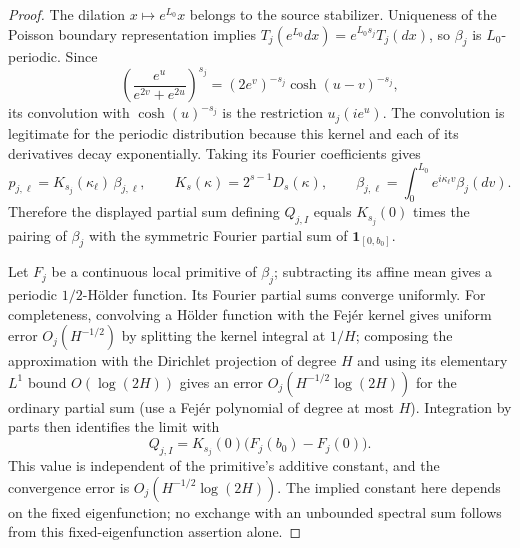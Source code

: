 \begin{proof}
The dilation $x\mapsto e^{L_0}x$ belongs to the source
stabilizer. Uniqueness of the Poisson boundary representation
implies $T_j(e^{L_0}dx)=e^{L_0s_j}T_j(dx)$, so $\beta_j$ is
$L_0$-periodic. Since
\[
 \left(\frac{e^u}{e^{2v}+e^{2u}}\right)^{s_j}
     =(2e^v)^{-s_j}\cosh(u-v)^{-s_j},
\]
its convolution with $\cosh(u)^{-s_j}$ is the restriction
$u_j(ie^u)$. The convolution is legitimate for the periodic
distribution because this kernel and each of its derivatives
decay exponentially. Taking its Fourier coefficients gives
\[
 p_{j,\ell}=K_{s_j}(\kappa_\ell)\,\beta_{j,\ell},
 \qquad K_s(\kappa)=2^{s-1}D_s(\kappa),\qquad
 \beta_{j,\ell}=\int_0^{L_0}e^{i\kappa_\ell v}\beta_j(dv).
\]
Therefore the displayed partial sum defining $Q_{j,I}$ equals
$K_{s_j}(0)$ times the pairing of $\beta_j$ with the symmetric
Fourier partial sum of $\mathbf1_{[0,b_0]}$.

Let $F_j$ be a continuous local primitive of $\beta_j$;
subtracting its affine mean gives a periodic $1/2$-H\"older
function. Its Fourier partial sums converge uniformly. For
completeness, convolving a H\"older function with the Fej\'er
kernel gives uniform error $O_j(H^{-1/2})$ by splitting the
kernel integral at $1/H$; composing the approximation with the
Dirichlet projection of degree $H$ and using its elementary
$L^1$ bound $O(\log(2H))$ gives an error
$O_j(H^{-1/2}\log(2H))$ for the ordinary partial sum (use a
Fej\'er polynomial of degree at most $H$). Integration by parts
then identifies the limit with
\[
 Q_{j,I}=K_{s_j}(0)\bigl(F_j(b_0)-F_j(0)\bigr).
\]
This value is independent of the primitive's additive constant,
and the convergence error is $O_j(H^{-1/2}\log(2H))$.
The implied constant here depends on the fixed eigenfunction;
no exchange with an unbounded spectral sum follows from this
fixed-eigenfunction assertion alone.
\end{proof}
